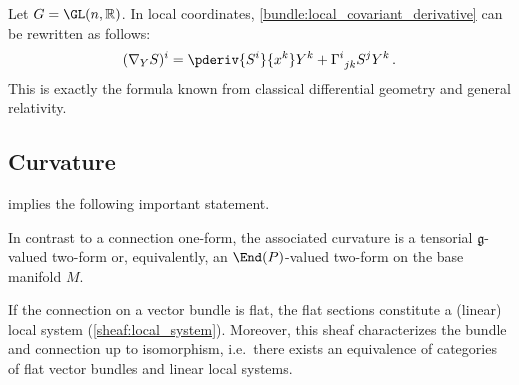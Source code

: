     \begin{example}
        Let $G=\GL(n,\mathbb{R})$. In local coordinates, \cref{bundle:local_covariant_derivative} can be rewritten as follows:
        \begin{gather}
            (\nabla_YS)^i = \pderiv{S^i}{x^k}Y^k + \Gamma^i_{\ jk}S^jY^k\,.
        \end{gather}
        This is exactly the formula known from classical differential geometry and general relativity.
    \end{example}

\subsection{Curvature}


     implies the following important statement.
    \begin{property}[Tensorial]
        In contrast to a connection one-form, the associated curvature is a tensorial $\mathfrak{g}$-valued two-form or, equivalently, an $\End(P)$-valued two-form on the base manifold $M$.
    \end{property}


    \begin{property}
        If the connection on a vector bundle is flat, the flat sections constitute a (linear) local system (\cref{sheaf:local_system}). Moreover, this sheaf characterizes the bundle and connection up to isomorphism, i.e.~there exists an equivalence of categories of flat vector bundles and linear local systems.
    \end{property}


